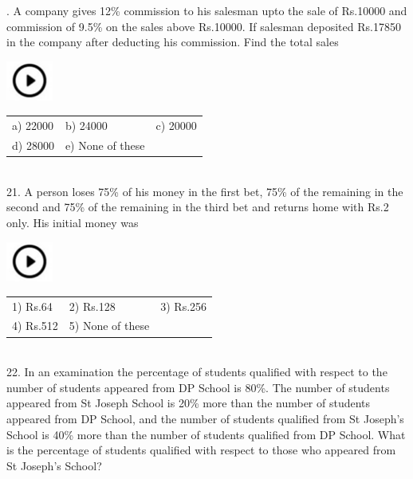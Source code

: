 \documentclass{article}
\begin{document}
\noindent 

. A  company  gives  12\%  commission  to  his  salesman  upto  the  sale  of  Rs.10000  and commission of 9.5\% on the sales above Rs.10000. If salesman deposited Rs.17850 in the company after deducting his commission. Find the total sales

\noindent   \includegraphics*[width=0.60in, height=0.52in]{images/image1}
\begin{tabular}{p{1.7in} p{1.6in} p{1.6in}} \\ 
 a) 22000      &  b) 24000     &  c) 20000     \\
 d) 28000    &      e) None of these \\
\end{tabular}
                                             

\noindent 

\noindent 

\noindent \\
21. A person loses 75\% of his money in the first bet, 75\% of the remaining in the second and 75\% of the remaining in the third bet and returns home with Rs.2 only. His initial money was

\noindent 

\noindent   \includegraphics*[width=0.60in, height=0.52in]{images/image1}  
\begin{tabular}{p{1.7in} p{1.6in} p{1.6in}} \\ 
	 1) Rs.64   &   2) Rs.128    & 3) Rs.256    \\
	 4) Rs.512      &     5) None of these \\
\end{tabular}
                                           

\noindent 

\noindent 

\noindent \\
 22. In  an  examination  the  percentage  of  students  qualified  with  respect  to  the  number  of students appeared from DP School is 80\%. The number of students appeared from St Joseph School is 20\% more than the number of students appeared from DP School, and the number  of students qualified from St Joseph's School is 40\% more than the number of students qualified from DP School. What is the percentage of students qualified with respect to those who appeared from St Joseph's School?
\end{document}

